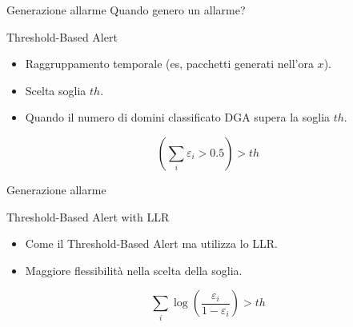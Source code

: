 \begin{frame}{Generazione allarme}
  Quando genero un allarme?
  \vfill
  \begin{block}{Threshold-Based Alert}
    \vfill
    \begin{itemize}
      \item Raggruppamento temporale (es, pacchetti generati nell'ora $x$).
      \item Scelta soglia $th$.
      \item Quando il numero di domini classificato DGA supera la soglia $th$.
    \end{itemize}

    \begin{equation*}
      \left( \sum_i \varepsilon_i > 0.5 \right) > th%
    \end{equation*}
    \vfill
  \end{block}
  \vfill

  
\end{frame}



\begin{frame}{Generazione allarme}
  \begin{block}{Threshold-Based Alert with LLR}
    \vfill
    \begin{itemize}
      \item Come il Threshold-Based Alert ma utilizza lo \acl{LLR}.
      \item Maggiore flessibilità nella scelta della soglia.
    \end{itemize}

    \begin{equation*}
        \sum_i \log\left( \frac{\varepsilon_i}{1 - \varepsilon_i} \right) > th%
    \end{equation*}
    \vfill
  \end{block}
  \vfill
\end{frame}

